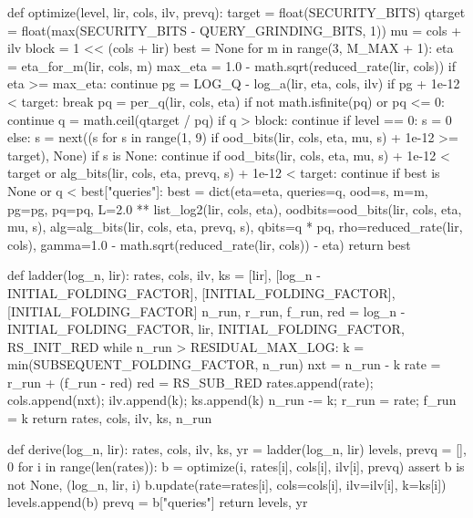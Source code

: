 \begin{srccode}
def optimize(level, lir, cols, ilv, prevq):
    target = float(SECURITY_BITS)
    qtarget = float(max(SECURITY_BITS - QUERY_GRINDING_BITS, 1))
    mu = cols + ilv
    block = 1 << (cols + lir)
    best = None
    for m in range(3, M_MAX + 1):
        eta = eta_for_m(lir, cols, m)
        max_eta = 1.0 - math.sqrt(reduced_rate(lir, cols))
        if eta >= max_eta:
            continue
        pg = LOG_Q - log_a(lir, eta, cols, ilv)
        if pg + 1e-12 < target:
            break
        pq = per_q(lir, cols, eta)
        if not math.isfinite(pq) or pq <= 0:
            continue
        q = math.ceil(qtarget / pq)
        if q > block:
            continue
        if level == 0:
            s = 0
        else:
            s = next((s for s in range(1, 9) if ood_bits(lir, cols, eta, mu, s) + 1e-12 >= target), None)
            if s is None:
                continue
        if ood_bits(lir, cols, eta, mu, s) + 1e-12 < target or alg_bits(lir, cols, eta, prevq, s) + 1e-12 < target:
            continue
        if best is None or q < best["queries"]:
            best = dict(eta=eta, queries=q, ood=s, m=m, pg=pg, pq=pq,
                        L=2.0 ** list_log2(lir, cols, eta),
                        oodbits=ood_bits(lir, cols, eta, mu, s),
                        alg=alg_bits(lir, cols, eta, prevq, s),
                        qbits=q * pq, rho=reduced_rate(lir, cols),
                        gamma=1.0 - math.sqrt(reduced_rate(lir, cols)) - eta)
    return best

def ladder(log_n, lir):
    rates, cols, ilv, ks = [lir], [log_n - INITIAL_FOLDING_FACTOR], [INITIAL_FOLDING_FACTOR], [INITIAL_FOLDING_FACTOR]
    n_run, r_run, f_run, red = log_n - INITIAL_FOLDING_FACTOR, lir, INITIAL_FOLDING_FACTOR, RS_INIT_RED
    while n_run > RESIDUAL_MAX_LOG:
        k = min(SUBSEQUENT_FOLDING_FACTOR, n_run)
        nxt = n_run - k
        rate = r_run + (f_run - red)
        red = RS_SUB_RED
        rates.append(rate); cols.append(nxt); ilv.append(k); ks.append(k)
        n_run -= k; r_run = rate; f_run = k
    return rates, cols, ilv, ks, n_run

def derive(log_n, lir):
    rates, cols, ilv, ks, yr = ladder(log_n, lir)
    levels, prevq = [], 0
    for i in range(len(rates)):
        b = optimize(i, rates[i], cols[i], ilv[i], prevq)
        assert b is not None, (log_n, lir, i)
        b.update(rate=rates[i], cols=cols[i], ilv=ilv[i], k=ks[i])
        levels.append(b)
        prevq = b["queries"]
    return levels, yr


\end{srccode}
